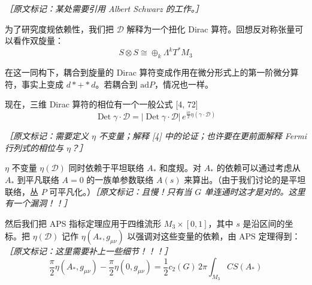 {\small\itshape ［原文标记：某处需要引用 Albert Schwarz 的工作。］}

为了研究度规依赖性，我们把 $\mathcal{D}$ 解释为一个扭化 Dirac 算符。回想反对称张量可以看作双旋量：
\begin{equation}
  S\otimes S\cong\oplus_{k}\Lambda^{k}T^{*}M_3
  \tag{3.22}
  \label{eq:3.22}
\end{equation}

在这一同构下，耦合到旋量的 Dirac 算符变成作用在微分形式上的第一阶微分算符，事实上变成 $d*+*d$。若耦合到 $\mathrm{ad}P$，情况也一样。

现在，三维 Dirac 算符的相位有一个一般公式 [4, 72]
\begin{equation}
  \operatorname{Det}\gamma\cdot\mathcal{D}=|\operatorname{Det}\gamma\cdot\mathcal{D}|\,e^{\frac{\mathrm{i}\pi}{2}\eta(\gamma\cdot\mathcal{D})}
  \tag{3.23}
  \label{eq:3.23}
\end{equation}

{\small\itshape ［原文标记：需要定义 $\eta$ 不变量；解释 [4] 中的论证；也许要在更前面解释 Fermi 行列式的相位与 $\eta$？］}

$\eta$ 不变量 $\eta(\mathcal{D})$ 同时依赖于平坦联络 $A_{*}$ 和度规。对 $A_{*}$ 的依赖可以通过考虑从 $A_{*}$ 到平凡联络 $A=0$ 的一族单参数联络 $A(s)$ 来算出。（由于我们讨论的是平坦联络，丛 $P$ 可平凡化。）{\small\itshape ［原文标记：且慢！只有当 $G$ 单连通时这才是对的。这里有一个漏洞！！］}

然后我们把 APS 指标定理应用于四维流形 $M_3\times[0,1]$，其中 $s$ 是沿区间的坐标。把 $\eta(\mathcal{D})$ 记作 $\eta(A_{*},g_{\mu\nu})$ 以强调对这些变量的依赖，由 APS 定理得到：{\small\itshape ［原文标记：这里需要补上一些细节！！！］}
\begin{equation}
  \frac{\pi}{2}\eta(A_{*},g_{\mu\nu})-\frac{\pi}{2}\eta(0,g_{\mu\nu})=\frac{1}{2}c_{2}(G)\,2\pi\int_{M_3}CS(A_{*})
  \tag{3.24}
  \label{eq:3.24}
\end{equation}

